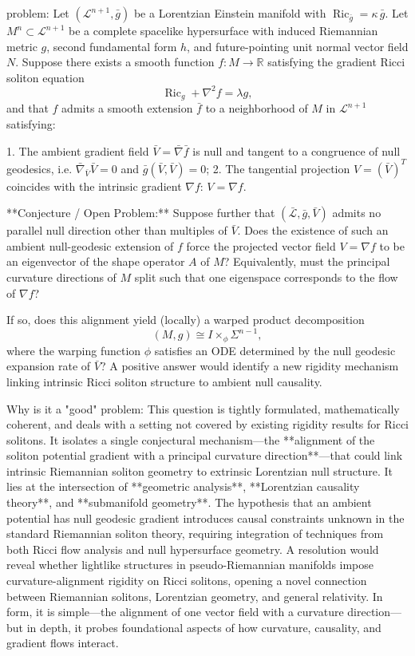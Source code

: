 problem:  
Let \((\mathcal{L}^{n+1}, \bar{g})\) be a Lorentzian Einstein manifold with \(\operatorname{Ric}_{\bar{g}} = \kappa\, \bar{g}\).  
Let \(M^n \subset \mathcal{L}^{n+1}\) be a complete spacelike hypersurface with induced Riemannian metric \(g\), second fundamental form \(h\), and future-pointing unit normal vector field \(N\).  
Suppose there exists a smooth function \(f : M \to \mathbb{R}\) satisfying the gradient Ricci soliton equation  
\[
\operatorname{Ric}_g + \nabla^2 f = \lambda g,
\]
and that \(f\) admits a smooth extension \(\bar{f}\) to a neighborhood of \(M\) in \(\mathcal{L}^{n+1}\) satisfying:  

1. The ambient gradient field \(\bar{V} = \bar{\nabla}\bar{f}\) is null and tangent to a congruence of null geodesics, i.e. \(\bar{\nabla}_{\bar{V}}\bar{V}=0\) and \(\bar{g}(\bar{V},\bar{V})=0\);  
2. The tangential projection \(V = (\bar{V})^T\) coincides with the intrinsic gradient \(\nabla f\): \(V=\nabla f\).  

**Conjecture / Open Problem:**  
Suppose further that \((\bar{\mathcal{L}},\bar{g},\bar{V})\) admits no parallel null direction other than multiples of \(\bar{V}\).  
Does the existence of such an ambient null-geodesic extension of \(f\) force the projected vector field \(V=\nabla f\) to be an eigenvector of the shape operator \(A\) of \(M\)?  
Equivalently, must the principal curvature directions of \(M\) split such that one eigenspace corresponds to the flow of \(\nabla f\)?  

If so, does this alignment yield (locally) a warped product decomposition  
\[
(M,g) \cong I \times_\phi \Sigma^{n-1},
\]
where the warping function \(\phi\) satisfies an ODE determined by the null geodesic expansion rate of \(\bar{V}\)?  
A positive answer would identify a new rigidity mechanism linking intrinsic Ricci soliton structure to ambient null causality.

Why is it a "good" problem:  
This question is tightly formulated, mathematically coherent, and deals with a setting not covered by existing rigidity results for Ricci solitons. It isolates a single conjectural mechanism—the **alignment of the soliton potential gradient with a principal curvature direction**—that could link intrinsic Riemannian soliton geometry to extrinsic Lorentzian null structure.  
It lies at the intersection of **geometric analysis**, **Lorentzian causality theory**, and **submanifold geometry**.  The hypothesis that an ambient potential has null geodesic gradient introduces causal constraints unknown in the standard Riemannian soliton theory, requiring integration of techniques from both Ricci flow analysis and null hypersurface geometry.  
A resolution would reveal whether lightlike structures in pseudo-Riemannian manifolds impose curvature-alignment rigidity on Ricci solitons, opening a novel connection between Riemannian solitons, Lorentzian geometry, and general relativity. In form, it is simple—the alignment of one vector field with a curvature direction—but in depth, it probes foundational aspects of how curvature, causality, and gradient flows interact.